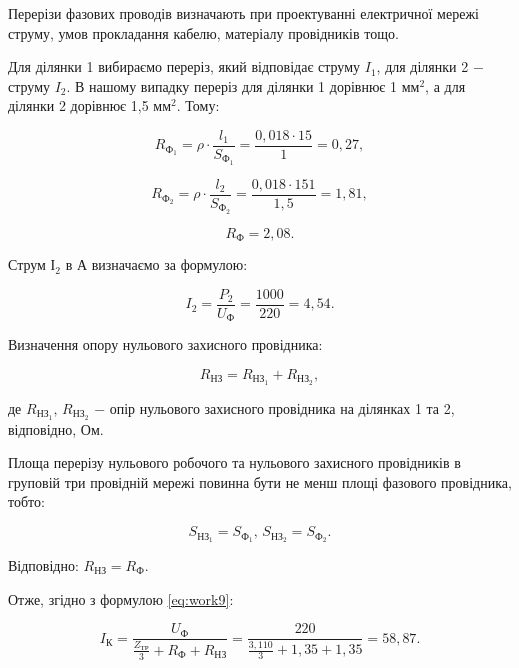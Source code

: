 \vspace{1.5em}

Перерізи фазових проводів визначають при проектуванні електричної мережі струму, умов прокладання кабелю, матеріалу провідників тощо.

Для ділянки 1 вибираємо переріз, який відповідає струму $I_{1}$, для ділянки 2 $-$ струму $I_{2}$. В нашому випадку переріз для ділянки 1 дорівнює 1 $\text{мм}^{2}$, а для ділянки 2  дорівнює 1,5 $\text{мм}^{2}$. Тому:

\[
	R_{\text{Ф}_{1}} = \rho \cdot \frac{l_{1}}{S_{\text{Ф}_{1}}} = \frac{0,018 \cdot 15}{1} = 0,27,
\]

\[
	R_{\text{Ф}_{2}} = \rho \cdot \frac{l_{2}}{S_{\text{Ф}_{2}}} = \frac{0,018 \cdot 151}{1,5} = 1,81,
\]

\[
	R_{\text{Ф}} = 2,08.
\]

\vspace{1.5em}

Струм $І_{2}$ в А визначаємо за формулою:

\begin{equation}\label{eq:work13}
	I_{2} = \frac{P_{2}}{U_{\text{Ф}}} = \frac{1000}{220} = 4,54.
\end{equation}

\vspace{1.5em}

Визначення опору нульового захисного провідника:

\begin{equation}\label{eq:work14}
	R_{\text{НЗ}} = R_{\text{НЗ}_{1}} + R_{\text{НЗ}_{2}},
\end{equation}

\noindent де $R_{\text{НЗ}_{1}}, \, R_{\text{НЗ}_{2}}$ $-$ опір нульового захисного провідника на ділянках 1 та 2,     відповідно, Ом.

Площа перерізу нульового робочого та нульового захисного провідників в груповій три провідній мережі повинна бути не менш площі фазового провідника, тобто:

\[
	S_{\text{НЗ}_{1}} = S_{\text{Ф}_{1}}, \, S_{\text{НЗ}_{2}} = S_{\text{Ф}_{2}}.
\]

\vspace{1.5em}

Відповідно: $R_{\text{НЗ}} = R_{\text{Ф}}$.

Отже, згідно з формулою \ref{eq:work9}:

\[
	I_{\text{К}} = \frac{U_{\text{Ф}}}{\frac{Z_{\text{ТР}}}{3} + R_{\text{Ф}} + R_{\text{НЗ}}} = \frac{220}{\frac{3,110}{3} + 1,35 + 1,35} = 58,87.
\]

